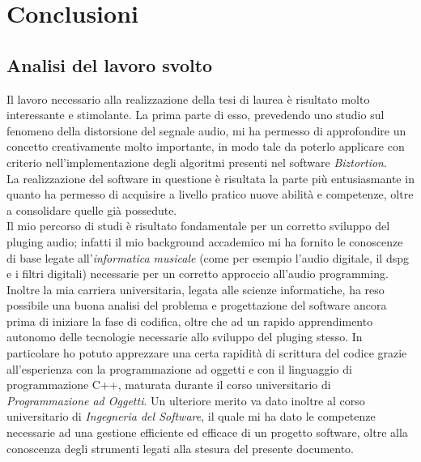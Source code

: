 
\chapter{Conclusioni}
\label{cap:conclusioni}
\section{Analisi del lavoro svolto}
Il lavoro necessario alla realizzazione della tesi di laurea è risultato molto interessante e stimolante. La prima parte di esso, prevedendo uno studio sul fenomeno della distorsione del segnale audio, mi ha permesso di approfondire un concetto creativamente molto importante, in modo tale da poterlo applicare con criterio nell'implementazione degli algoritmi presenti nel software \textit{Biztortion}. \\
La realizzazione del software in questione è risultata la parte più entusiasmante in quanto ha permesso di acquisire a livello pratico nuove abilità e competenze, oltre a consolidare quelle già possedute. \\
Il mio percorso di studi è risultato fondamentale per un corretto sviluppo del \gls{pluging} audio; infatti il mio background accademico mi ha fornito le conoscenze di base legate all'\textit{informatica musicale} (come per esempio l'audio digitale, il \gls{dspg} e i filtri digitali) necessarie per un corretto approccio all'audio programming. Inoltre la mia carriera universitaria, legata alle scienze informatiche, ha reso possibile una buona analisi del problema e progettazione del software ancora prima di iniziare la fase di codifica, oltre che ad un rapido apprendimento autonomo delle tecnologie necessarie allo sviluppo del \gls{pluging} stesso. In particolare ho potuto apprezzare una certa rapidità di scrittura del codice grazie all'esperienza con la programmazione ad oggetti e con il linguaggio di programmazione C++, maturata durante il corso universitario di \textit{Programmazione ad Oggetti}. Un ulteriore merito va dato inoltre al corso universitario di \textit{Ingegneria del Software}, il quale mi ha dato le competenze necessarie ad una gestione efficiente ed efficace di un progetto software, oltre alla conoscenza degli strumenti legati alla stesura del presente documento.

